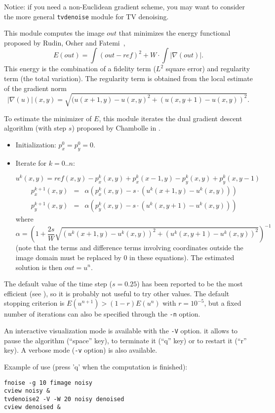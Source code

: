 Notice: if you need a non-Euclidean gradient scheme,
you may want to consider the more general \verb+tvdenoise+ module
for TV denoising.

\medskip

This module computes the image $out$ that minimizes the energy
functional proposed by Rudin, Osher and 
Fatemi~\cite{rudin.osher.ea:nonlinear}\cite{rudin.osher:total},
$$E(out) = \int (out -ref)^2 + W \cdot \int |\nabla(out)|.$$
This energy is the combination of a fidelity term ($L^2$ square error)
and regularity term (the total variation).
The regularity term is obtained from the local estimate of the gradient norm
$$|\nabla(u)|(x,y) = \sqrt{(u(x+1,y)-u(x,y)^2+(u(x,y+1)-u(x,y))^2}.$$

\medskip

To estimate the minimizer of $E$, this module iterates 
the dual gradient descent algorithm (with step $s$) proposed by
Chambolle in \cite{chambolle:algotvdual}.

\begin{itemize}

\item Initialization: $p_x^0 = p_y^0 = 0$.

\item Iterate for $k=0..n$:

$$u^k(x,y)= ref(x,y)-p_x^k(x,y)+p_x^k(x-1,y)-p_y^k(x,y)+p_y^k(x,y-1)$$
\begin{eqnarray*}
p_x^{k+1}(x,y) &=& \alpha 
\left(p_x^k(x,y)-s\cdot (u^k(x+1,y)-u^k(x,y))\right)\\
p_y^{k+1}(x,y) &=& \alpha 
\left(p_y^k(x,y)-s\cdot (u^k(x,y+1)-u^k(x,y))\right)
\end{eqnarray*}
where 
$$\alpha = \left(1+\frac{2s}W 
\sqrt{(u^k(x+1,y)-u^k(x,y))^2+(u^k(x,y+1)-u^k(x,y))^2}\right)^{-1}$$
(note that the terms and difference terms
involving coordinates outside the image domain 
must be replaced by 0 in these equations). The estimated solution is then 
$out=u^n$.

\end{itemize}

The default value of the time step ($s=0.25$) has been reported to
be the most efficient (see \cite{chambolle:algotvdual}), so it is 
probably not useful to try other values. The default 
stopping criterion is $E(u^{n+1})>(1-r)E(u^n)$ with $r=10^{-5}$,
but a fixed number of iterations can also be specified through the
\verb+-n+ option.

\medskip

An interactive visualization mode is available with
the \verb+-V+ option. it allows to pause the algorithm (``space'' key),
to terminate it (``q'' key) or to restart it (``r'' key).
A verbose mode (\verb+-v+ option) is also available.

\medskip

Example of use (press 'q' when the computation is finished):
\begin{verbatim}
fnoise -g 10 fimage noisy
cview noisy &
tvdenoise2 -V -W 20 noisy denoised
cview denoised &
\end{verbatim}

